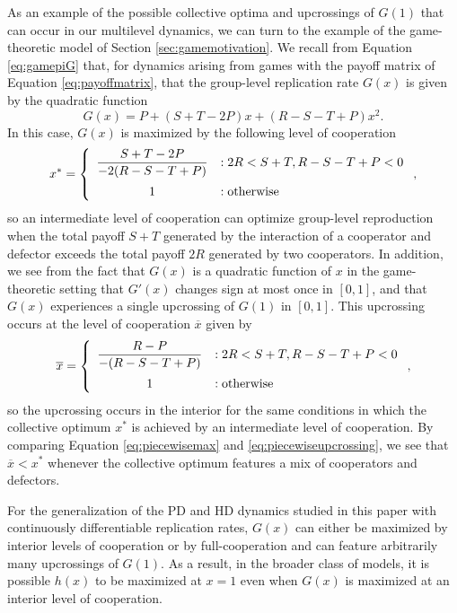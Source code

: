 \documentclass[11pt]{article}
\numberwithin{equation}{section}
\newcommand{\ds}{\displaystyle}
\begin{document}
{\begin{example} \label{rem:peakupcross}
As an example of the possible collective optima and upcrossings of $G(1)$ that can occur in our multilevel dynamics, we can turn to the example of the game-theoretic model of Section \eqref{sec:gamemotivation}. We recall from Equation \eqref{eq:gamepiG} that, for dynamics arising from games with the payoff matrix of Equation \eqref{eq:payoffmatrix}, that the group-level replication rate $G(x)$ is given by the quadratic function
\[G(x) = P + (S+T-2P)x + (R-S-T+P) x^2. \]
In this case, $G(x)$ is maximized by the following level of cooperation
\begin{equation} \label{eq:piecewisemax}
    x^* = \left\{
     \begin{array}{cl}
            \ds\frac{S+T-2P}{-2(R - S - T + P)} & : 2R < S + T, R - S - T + P < 0 \vspace{2mm} \\
       1 & : \mathrm{otherwise} 
     \end{array}
   \right.,
\end{equation}
%
so an intermediate level of cooperation can optimize group-level reproduction when the total payoff $S+T$ generated by the interaction of a cooperator and defector exceeds the total payoff $2R$ generated by two cooperators. In addition, we see from the fact that $G(x)$ is a quadratic function of $x$ in the game-theoretic setting that $G'(x)$ changes sign at most once in $[0,1]$, and that $G(x)$ experiences a single upcrossing of $G(1)$ in $[0,1]$.
This upcrossing occurs at the level of cooperation $\overline{x}$ given by
\begin{equation} \label{eq:piecewiseupcrossing}
    \overline{x} = \left\{
     \begin{array}{cl}
            \ds\frac{R-P}{-(R - S - T + P)} & : 2R < S + T, R - S - T + P < 0 \vspace{2mm} \\
       1 & : \mathrm{otherwise} 
     \end{array}
   \right.,
\end{equation}
so the upcrossing occurs in the interior for the same conditions in which the collective optimum $x^*$ is achieved by an intermediate level of cooperation. By comparing Equation \eqref{eq:piecewisemax} and \eqref{eq:piecewiseupcrossing}, we see that $\overline{x} < x^*$ whenever the collective optimum features a mix of cooperators and defectors.

For the  generalization of the PD and HD dynamics studied in this paper with continuously differentiable replication rates, $G(x)$ can either be maximized by interior levels of cooperation or by full-cooperation and can feature arbitrarily many upcrossings of $G(1)$. As a result, in the broader class of models, it is possible $h(x)$ to be maximized at $x=1$ even when $G(x)$ is maximized at an interior level of cooperation.
\end{example}


}
\end{document}
